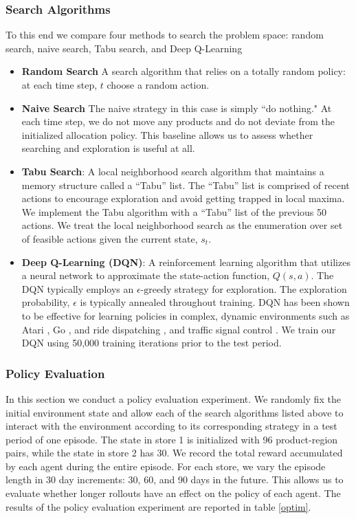 \subsubsection{Search Algorithms}
To this end we compare four methods to search the problem  space: random search, naive search, Tabu search, and Deep Q-Learning
\begin{itemize}
    \item \textbf{Random Search} A search algorithm that relies on a totally random policy: at each time step, $t$ choose a random action.
    \item \textbf{Naive Search} The naive strategy in this case is simply ``do nothing." At each time step, we do not move any products and do not deviate from the initialized allocation policy. This baseline allows us to assess whether searching and exploration is useful at all.
    \item \textbf{Tabu Search}: A local neighborhood search algorithm that maintains a memory structure called a ``Tabu'' list. The ``Tabu'' list is comprised of recent actions to encourage exploration and avoid getting trapped in local maxima. We implement the Tabu algorithm with a ``Tabu'' list of the previous 50 actions. We treat the local neighborhood search as the enumeration over set of feasible actions given the current state, $s_t$.
    \item \textbf{Deep Q-Learning (DQN)}: A reinforcement learning algorithm that utilizes a neural network to approximate the state-action function, $Q(s, a)$. The DQN typically employs an $\epsilon\text{-greedy}$  strategy for exploration. The exploration probability, $\epsilon$ is typically annealed throughout training. DQN has been shown to be effective for learning policies in complex, dynamic environments such as Atari \cite{mnih}, Go \cite{silver-16} \cite{silver-17}, and ride dispatching \cite{lin-msu}, and traffic signal control \cite{intellilight}. We train our DQN using 50,000 training iterations prior to the test period.
\end{itemize}

\subsubsection{Policy Evaluation}



In this section we conduct a policy evaluation experiment. We randomly fix the initial environment state and allow each of the search algorithms listed above to interact with the environment according to its corresponding strategy in a test period of one episode. The state in store 1 is initialized with 96 product-region pairs, while the state in store 2 has 30. We record the total reward accumulated by each agent during the entire episode. For each store, we vary the episode length in 30 day increments: 30, 60, and 90 days in the future. This allows us to evaluate whether longer rollouts have an effect on the policy of each agent. The results of the policy evaluation experiment are reported in table \ref{optim}.

